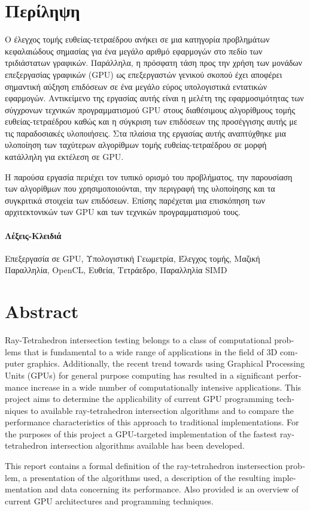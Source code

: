 \chapter*{Περίληψη}
\pagestyle{plain}

\noindent Ο έλεγχος τομής ευθείας-τετραέδρου ανήκει σε μια κατηγορία προβλημάτων κεφαλαιώδους σημασίας για ένα μεγάλο αριθμό εφαρμογών στο πεδίο  των τριδιάστατων γραφικών. Παράλληλα, η πρόσφατη τάση προς την χρήση των μονάδων επεξεργασίας γραφικών (GPU) ως επεξεργαστών γενικού σκοπού έχει αποφέρει σημαντική αύξηση επιδόσεων σε ένα μεγάλο εύρος υπολογιστικά εντατικών εφαρμογών. Αντικείμενο της εργασίας αυτής είναι η μελέτη της εφαρμοσιμότητας των σύγχρονων τεχνικών προγραμματισμού GPU στους διαθέσιμους αλγορίθμους τομής ευθείας-τετραέδρου καθώς και η σύγκριση των επιδόσεων της προσέγγισης αυτής με τις παραδοσιακές υλοποιήσεις. Στα πλαίσια της εργασίας αυτής αναπτύχθηκε μια υλοποίηση των ταχύτερων αλγορίθμων τομής ευθείας-τετραέδρου σε μορφή κατάλληλη για εκτέλεση σε GPU.

Η παρούσα εργασία περιέχει τον τυπικό ορισμό του προβλήματος, την παρουσίαση των αλγορίθμων που χρησιμοποιούνται, την περιγραφή της υλοποίησης και τα συγκριτικά στοιχεία των επιδόσεων. Επίσης παρέχεται μια επισκόπηση των αρχιτεκτονικών των GPU και των τεχνικών προγραμματισμού τους.

\subsubsection*{Λέξεις-Κλειδιά}

\noindent Επεξεργασία σε GPU, Υπολογιστική Γεωμετρία, Έλεγχος τομής, Μαζική Παραλληλία, OpenCL, Ευθεία, Τετράεδρο, Παραλληλία SIMD 

\chapter*{Abstract}
\begin{english}
\noindent Ray-Tetrahedron intersection testing belongs to a class of computational problems that is fundamental to a wide range of applications in the field of 3D computer graphics. Additionally, the recent trend towards using Graphical Processing Units (GPUs) for general purpose computing has resulted in a significant performance increase in a wide number of computationally intensive applications. This project aims to determine the applicability of current GPU programming techniques to available ray-tetrahedron intersection algorithms and to compare the performance characteristics of this approach to traditional implementations. For the purposes of this project a GPU-targeted implementation of the fastest ray-tetrahedron intersection algorithms available has been developed. 

This report contains a formal definition of the ray-tetrahedron instersection problem, a presentation of the algorithms used, a description of the resulting implementation and data concerning its performance. Also provided is an overview of current GPU architectures and programming techniques.
\end{english} 

